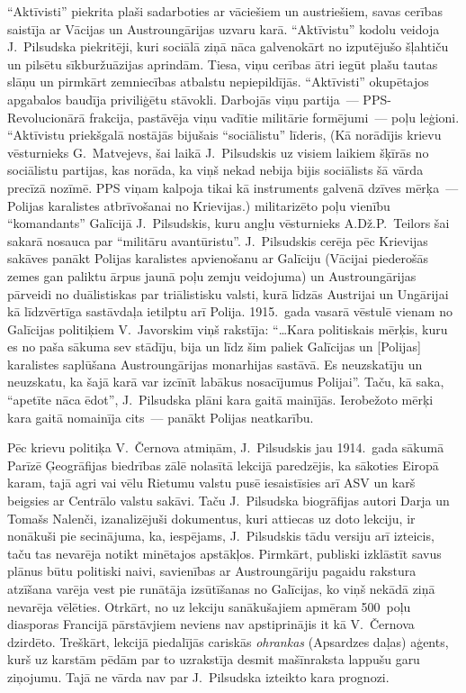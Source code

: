 \documentclass[twoside,a5paper,12pt,fleqn,openany]{extbook}
\begin{document}
``Aktīvisti'' piekrita plaši sadarboties ar vāciešiem un austriešiem, savas cerības saistīja ar Vācijas un Austroungārijas uzvaru karā. ``Aktīvistu'' kodolu veidoja J.~Pilsudska piekritēji, kuri sociālā ziņā nāca galvenokārt no izputējušo šļahtiču un pilsētu sīkburžuāzijas aprindām. Tiesa, viņu cerības ātri iegūt plašu tautas slāņu un pirmkārt zemniecības atbalstu nepiepildījās. ``Aktīvisti'' okupētajos apgabalos baudīja priviliģētu stāvokli. Darbojās viņu partija~--- PPS-Revolucionārā frakcija, pastāvēja viņu vadītie militārie formējumi~--- poļu leģioni. ``Aktīvistu priekšgalā nostājās bijušais ``sociālistu'' līderis, (Kā norādījis krievu vēsturnieks G.~Matvejevs, šai laikā J.~Pilsudskis uz visiem laikiem šķīrās no sociālistu partijas, kas norāda, ka viņš nekad nebija bijis sociālists šā vārda precīzā nozīmē. PPS viņam kalpoja tikai kā instruments galvenā dzīves mērķa~--- Polijas karalistes atbrīvošanai no Krievijas.) militarizēto poļu vienību ``komandants'' Galīcijā J.~Pilsudskis, kuru angļu vēsturnieks A.Dž.P.~Teilors šai sakarā nosauca par ``militāru avantūristu''. J.~Pilsudskis cerēja pēc Krievijas sakāves panākt Polijas karalistes apvienošanu ar Galīciju (Vācijai piederošās zemes gan paliktu ārpus jaunā poļu zemju veidojuma) un Austroungārijas pārveidi no duālistiskas par triālistisku valsti, kurā līdzās Austrijai un Ungārijai kā līdzvērtīga sastāvdaļa ietilptu arī Polija. 1915.~gada vasarā vēstulē vienam no Galīcijas politiķiem V.~Javorskim viņš rakstīja: ``\dots{}Kara politiskais mērķis, kuru es no paša sākuma sev stādīju, bija un līdz šim paliek Galīcijas un [Polijas] karalistes saplūšana Austroungārijas monarhijas sastāvā. Es neuzskatīju un neuzskatu, ka šajā karā var izcīnīt labākus nosacījumus Polijai''. Taču, kā saka, ``apetīte nāca ēdot'', J.~Pilsudska plāni kara gaitā mainījās. Ierobežoto mērķi kara gaitā nomainīja cits~--- panākt Polijas neatkarību.

Pēc krievu politiķa V.~Černova atmiņām, J.~Pilsudskis jau 1914.~gada sākumā Parīzē Ģeogrāfijas biedrības zālē nolasītā lekcijā paredzējis, ka sākoties Eiropā karam, tajā agri vai vēlu Rietumu valstu pusē iesaistīsies arī ASV un karš beigsies ar Centrālo valstu sakāvi. Taču J.~Pilsudska biogrāfijas autori Darja un Tomašs Nalenči, izanalizējuši dokumentus, kuri attiecas uz doto lekciju, ir nonākuši pie secinājuma, ka, iespējams, J.~Pilsudskis tādu versiju arī izteicis, taču tas nevarēja notikt minētajos apstākļos. Pirmkārt, publiski izklāstīt savus plānus būtu politiski naivi, savienības ar Austroungāriju pagaidu rakstura atzīšana varēja vest pie runātāja izsūtīšanas no Galīcijas, ko viņš nekādā ziņā nevarēja vēlēties. Otrkārt, no uz lekciju sanākušajiem apmēram 500~poļu diasporas Francijā pārstāvjiem neviens nav apstiprinājis it kā V.~Černova dzirdēto. Treškārt, lekcijā piedalījās cariskās \emph{ohrankas} (Apsardzes daļas) aģents, kurš uz karstām pēdām par to uzrakstīja desmit mašīnraksta lappušu garu ziņojumu. Tajā ne vārda nav par J.~Pilsudska izteikto kara prognozi.
\end{document}
